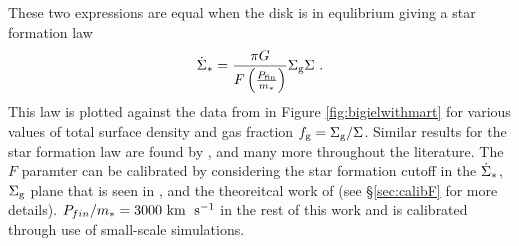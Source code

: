 These two expressions are equal when the disk is in equlibrium giving a star formation law
\begin{equation}
\label{eqn:martsfr}
\dot{\Sigma}_* = \frac{\pi G}{F \left(\frac{P_\mathrm{fin}}{m_*}\right)} \Sigma_\mathrm{g} \Sigma~.
\end{equation}
This law is plotted against the data from \citet{bigiel_star_2008} in Figure \ref{fig:bigielwithmart} for various values of total surface density and gas fraction $f_\mathrm{g} = \Sigma_\mathrm{g}/\Sigma$.
Similar results for the star formation law are found by \citet{ostriker_maximally_2011, faucher-giguere_feedback-regulated_2013, martizzi_supernova_2016}, and many more throughout the literature.
The $F$ paramter can be calibrated by considering the star formation cutoff in the $\dot{\Sigma}_*$, $\Sigma_\mathrm{g}$ plane that is seen in \citet{bigiel_star_2008}, and the theoreitcal work of \citet{schaye_star_2004} (see \S \ref{sec:calibF} for more details).
$P_{fin}/m_* = 3000 ~\mathrm{km}\;~\mathrm{s}^{-1}$ in the rest of this work and is calibrated through use of small-scale simulations.
